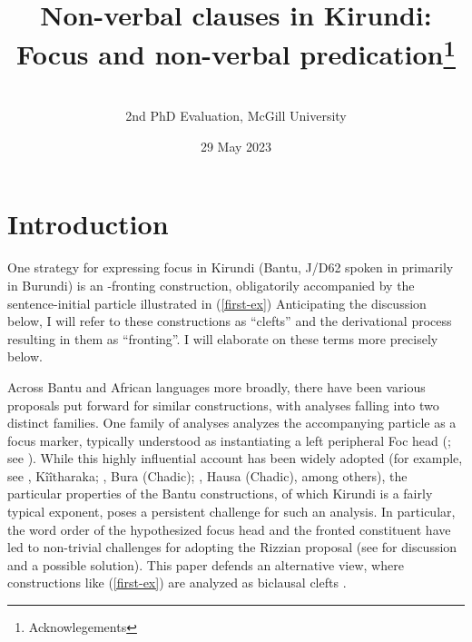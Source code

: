 \documentclass[12pt]{article}
\title{Non-verbal clauses in Kirundi: Focus and non-verbal predication\thanks{Acknowlegements}}
\author{\FNAME{} \LNAME{}\\2nd PhD Evaluation, McGill University}
\date{\tit{rev.} 29 May 2023}
\begin{document}
\maketitle
%

{\footnotesize \tableofcontents}

\newpage
{}

\section{Introduction}
One strategy for expressing focus in Kirundi (Bantu, J/D62 spoken in primarily in Burundi) is an \abar{}-fronting construction, obligatorily accompanied by the sentence-initial particle  illustrated in (\ref{first-ex})\footnotemark{} Anticipating the discussion below, I will refer to these constructions as ``clefts'' and the derivational process resulting in them as ``fronting''. I will elaborate on these terms more precisely below. 


\bex
\ex \bxl
	 \label{first-ex}
\fxl
\fex


Across Bantu and African languages more broadly, there have been various proposals put forward for similar constructions, with analyses falling into two distinct families. One family of analyses analyzes the accompanying particle as a focus marker, typically understood as instantiating a left peripheral Foc head (\citealt{rizzi-1997}; see \citealt{aboh-2016}). While this highly influential account has been widely adopted (for example, see \citealt{abels-muriungi-2008}, Kîîtharaka; \citealt{hartmann-zimmermann-2012}, Bura (Chadic); \citealt{green-2007}, Hausa (Chadic), among others), the particular properties of the Bantu constructions, of which Kirundi is a fairly typical exponent, poses a persistent challenge for such an analysis. In particular, the word order of the hypothesized focus head and the fronted constituent have led to non-trivial challenges for adopting the Rizzian proposal (see \citealt{fschwarz-2003,yuan-2017} for discussion and a possible solution). This paper defends an alternative view, where constructions like (\ref{first-ex}) are analyzed as biclausal clefts \citep{zentz-2016}.
\end{document}
